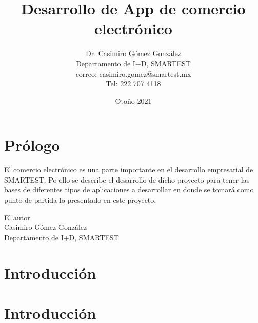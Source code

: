 \documentclass[12pt]{book}
\title{Desarrollo de App de comercio electrónico}
\author{Dr. Casimiro Gómez González\\
	Departamento de I+D, SMARTEST\\
               correo: casimiro.gomez@smartest.mx\\
               Tel: 222 707 4118}
\date{Otoño 2021}
\theoremstyle{definition}
\theoremstyle{remark}
\theoremstyle{plain}
\begin{document}
\frontmatter
\maketitle


\chapter{Prólogo}

El comercio electrónico es una parte importante en el desarrollo empresarial de SMARTEST. Po ello se describe el desarrollo de dicho proyecto para tener las bases de diferentes tipos de aplicaciones a desarrollar en donde se tomará como punto de partida lo presentado en este proyecto.
\begin{flushright}

El autor\\
Casimiro Gómez González\\
Departamento de I+D, SMARTEST
\end{flushright}

\tableofcontents

\mainmatter


\chapter{Introducción}


\chapter{Introducción}


\backmatter
\end{document}
